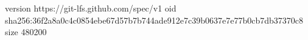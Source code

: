 version https://git-lfs.github.com/spec/v1
oid sha256:36f2a8a0c4c0854ebe67d57b7b744ade912e7c39b0637e7e77b0cb7db37370c8
size 480200
